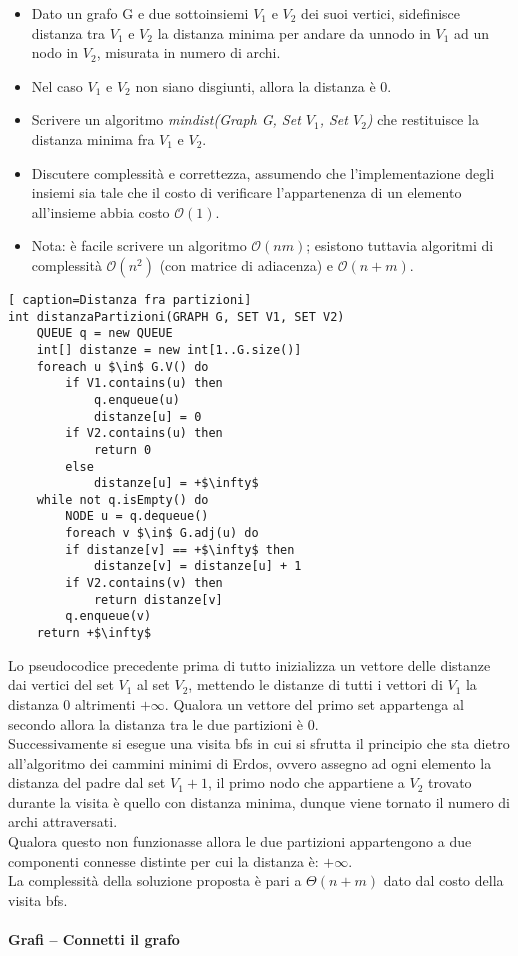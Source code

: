 \documentclass[../cheatSheetAlgoritmi.tex]{subfiles}
\begin{document}
\begin{itemize}
	\item Dato un grafo G e due sottoinsiemi $V_1$ e $V_2$ dei suoi vertici, sidefinisce distanza tra $V_1$ e $V_2$ la distanza minima per andare da unnodo in $V_1$ ad un nodo in $V_2$, misurata in numero di archi.
	\item Nel caso $V_1$ e $V_2$ non siano disgiunti, allora la distanza è 0.
	\item Scrivere un algoritmo \textit{mindist(Graph G, Set $V_1$, Set $V_2$)} che restituisce la distanza minima fra $V_1$ e $V_2$.
	\item Discutere complessità e correttezza, assumendo che l’implementazione degli insiemi sia tale che il costo di verificare l’appartenenza di un elemento all’insieme abbia costo $\mathcal{O}(1)$.
	\item Nota: è facile scrivere un algoritmo $\mathcal{O}(nm)$; esistono tuttavia algoritmi di complessità $\mathcal{O}(n^2)$ (con matrice di adiacenza) e $\mathcal{O}(n + m)$.
\end{itemize}

\newpage
\begin{lstlisting}[ caption=Distanza fra partizioni]
int distanzaPartizioni(GRAPH G, SET V1, SET V2)
	QUEUE q = new QUEUE
  	int[] distanze = new int[1..G.size()]
  	foreach u $\in$ G.V() do
    	if V1.contains(u) then
      		q.enqueue(u)
      		distanze[u] = 0
      	if V2.contains(u) then
        	return 0
    	else
      		distanze[u] = +$\infty$
 	while not q.isEmpty() do
    	NODE u = q.dequeue()
    	foreach v $\in$ G.adj(u) do
    	if distanze[v] == +$\infty$ then
      		distanze[v] = distanze[u] + 1
      	if V2.contains(v) then
        	return distanze[v]
      	q.enqueue(v)
  	return +$\infty$
\end{lstlisting}
Lo pseudocodice precedente prima di tutto inizializza un vettore delle distanze dai vertici del set $V_1$ al set $V_2$, mettendo le distanze di tutti i vettori di $V_1$ la distanza 0 altrimenti $+\infty$. Qualora un vettore del primo set appartenga al secondo allora la distanza tra le due partizioni è 0. \\
Successivamente si esegue una visita bfs in cui si sfrutta il principio che sta dietro all'algoritmo dei cammini minimi di Erdos, ovvero assegno ad ogni elemento la distanza del padre dal set $V_1 + 1$, il primo nodo che appartiene a $V_2$ trovato durante la visita è quello con distanza minima, dunque viene tornato il numero di archi attraversati. \\
Qualora questo non funzionasse allora le due partizioni appartengono a due componenti connesse distinte per cui la distanza è: $+\infty$. \\
La complessità della soluzione proposta è pari a $\Theta(n + m)$ dato dal costo della visita bfs.
\\\\
\textbf{Grafi – Connetti il grafo}\\
\end{document}
